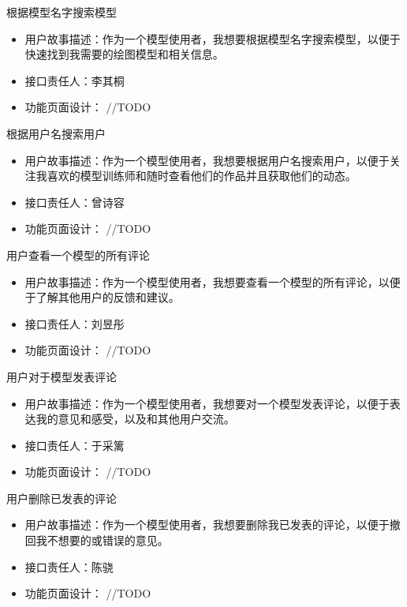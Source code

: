 \begin{frame}{根据模型名字搜索模型}
    \begin{itemize}
        \item 用户故事描述：作为一个模型使用者，我想要根据模型名字搜索模型，以便于快速找到我需要的绘图模型和相关信息。
        \item 接口责任人：李其桐
        \item 功能页面设计： //TODO
    \end{itemize}
\end{frame}

\begin{frame}{根据用户名搜索用户}
    \begin{itemize}
        \item 用户故事描述：作为一个模型使用者，我想要根据用户名搜索用户，以便于关注我喜欢的模型训练师和随时查看他们的作品并且获取他们的动态。
        \item 接口责任人：曾诗容
        \item 功能页面设计： //TODO
    \end{itemize}
\end{frame}

\begin{frame}{用户查看一个模型的所有评论}
    \begin{itemize}
        \item 用户故事描述：作为一个模型使用者，我想要查看一个模型的所有评论，以便于了解其他用户的反馈和建议。
        \item 接口责任人：刘昱彤
        \item 功能页面设计： //TODO
    \end{itemize}
\end{frame}

\begin{frame}{用户对于模型发表评论}
    \begin{itemize}
        \item 用户故事描述：作为一个模型使用者，我想要对一个模型发表评论，以便于表达我的意见和感受，以及和其他用户交流。
        \item 接口责任人：于采篱
        \item 功能页面设计： //TODO
    \end{itemize}
\end{frame}

\begin{frame}{用户删除已发表的评论}
    \begin{itemize}
        \item 用户故事描述：作为一个模型使用者，我想要删除我已发表的评论，以便于撤回我不想要的或错误的意见。
        \item 接口责任人：陈骁
        \item 功能页面设计： //TODO
    \end{itemize}
\end{frame}

